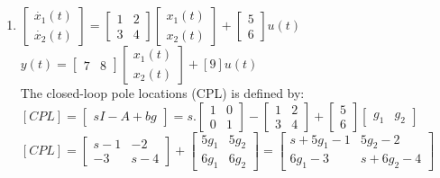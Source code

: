 \documentclass[14pt,a4paper]{article}
\begin{document}
\begin{enumerate}
	\item
		$\begin{bmatrix}\dot{x_1}(t)\\ \dot{x_2}(t) \end{bmatrix} = \begin{bmatrix} 1&2 \\ 3&4 \end{bmatrix} \begin{bmatrix}x_1(t) \\ x_2(t) \end{bmatrix} + \begin{bmatrix} 5\\6 \end{bmatrix}u(t)$ \\
		
		\hspace*{0.6cm} $y(t) = \begin{bmatrix} 7&8 \end{bmatrix} \begin{bmatrix} x_1(t)\\x_2(t) \end{bmatrix} + [9]u(t) $\\
		
		The closed-loop pole locations (CPL) is defined by:\\
		$[CPL] = \begin{bmatrix} sI-A+bg \end{bmatrix} = s.\begin{bmatrix}1&0\\0&1 \end{bmatrix} - \begin{bmatrix}1&2 \\3&4 \end{bmatrix} +  \begin{bmatrix} 5\\6 \end{bmatrix} \begin{bmatrix} g_1 & g_2 \end{bmatrix}$\\[0.2cm]
		$[CPL] = \begin{bmatrix}s-1&-2 \\-3&s-4 \end{bmatrix} + \begin{bmatrix} 5g_1 & 5g_2  \\6g_1 & 6g_2\end{bmatrix} = \begin{bmatrix}s+5g_1-1&5g_2-2 \\6g_1-3&s+6g_2-4 \end{bmatrix} $\\
		

\end{enumerate}
\end{document}
